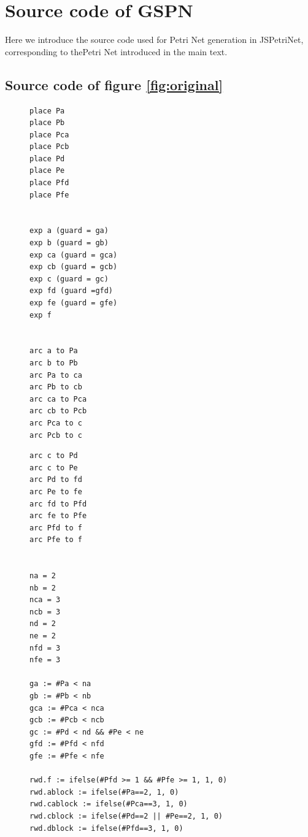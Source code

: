 \setlength{\columnseprule}{0.4pt}
\chapter{Source code of GSPN}
Here we introduce the source code used for Petri Net generation in JSPetriNet, corresponding to thePetri Net introduced in the main text.

\section{Source code of figure \ref{fig:original}}
\begin{figure}[ht]
\begin{small}
\begin{verbatim}
place Pa
place Pb
place Pca
place Pcb
place Pd
place Pe
place Pfd
place Pfe


exp a (guard = ga)
exp b (guard = gb)
exp ca (guard = gca)
exp cb (guard = gcb)
exp c (guard = gc)
exp fd (guard =gfd)
exp fe (guard = gfe)
exp f


arc a to Pa
arc b to Pb
arc Pa to ca
arc Pb to cb
arc ca to Pca
arc cb to Pcb
arc Pca to c
arc Pcb to c
\end{verbatim}
\end{small}
\end{figure}

\begin{figure}[ht]
\begin{small}
\begin{verbatim}
arc c to Pd
arc c to Pe
arc Pd to fd
arc Pe to fe
arc fd to Pfd
arc fe to Pfe
arc Pfd to f
arc Pfe to f


na = 2
nb = 2
nca = 3
ncb = 3
nd = 2
ne = 2
nfd = 3
nfe = 3

ga := #Pa < na
gb := #Pb < nb
gca := #Pca < nca
gcb := #Pcb < ncb
gc := #Pd < nd && #Pe < ne
gfd := #Pfd < nfd
gfe := #Pfe < nfe

rwd.f := ifelse(#Pfd >= 1 && #Pfe >= 1, 1, 0)
rwd.ablock := ifelse(#Pa==2, 1, 0)
rwd.cablock := ifelse(#Pca==3, 1, 0)
rwd.cblock := ifelse(#Pd==2 || #Pe==2, 1, 0)
rwd.dblock := ifelse(#Pfd==3, 1, 0)

\end{verbatim}
\end{small}
\end{figure}

\clearpage

